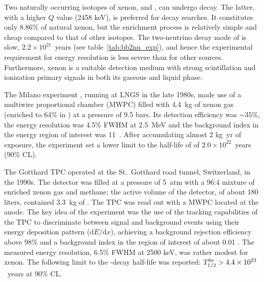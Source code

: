 Two naturally occurring isotopes of xenon,  and , can undergo \bb decay. The latter, with a higher $Q$ value (2458 keV), is preferred for \bbonu decay searches. It constitutes only 8.86\% of natural xenon, but the enrichment process is relatively simple and cheap compared to that of other \bb isotopes. The two-neutrino decay mode of  is slow, $2.2\times10^{21}$~years (see table~\ref{tab:bb2nu_exp}), and hence the experimental requirement for energy resolution is less severe than for other \bb sources. Furthermore, xenon is a suitable detection medium with strong scintillation and ionization primary signals in both its gaseous and liquid phase.

The Milano experiment \cite{Zanotti:1991vh}, running at LNGS in the late 1980s, made use of a multiwire proportional chamber (MWPC) filled with 4.4~kg of xenon gas (enriched to 64\% in ) at a pressure of 9.5 bars. Its detection efficiency was $\sim35\%$, the energy resolution was 4.5\% FWHM at 2.5~MeV and the background index in the energy region of interest was 11~\ckky. After accumulating almost 2 kg~yr of exposure, the experiment set a lower limit to the half-life of  of $2.0\times10^{22}$~years (90\% CL).

The Gotthard TPC \cite{Luscher:1998sd, Vuilleumier:1993zm} operated at the St.\ Gotthard road tunnel, Switzerland, in the 1990s. The detector was filled at a pressure of 5~atm with a 96:4 mixture of enriched xenon gas and methane; the active volume of the detector, of about 180 liters, contained 3.3~kg of . The TPC was read out with a MWPC located at the anode. The key idea of the experiment was the use of the tracking capabilities of the TPC to discriminate between signal and background events using their energy deposition pattern ($\mathrm{d}E/\mathrm{d}x$), achieving a background rejection efficiency above 98\% and a background index in the region of interest of about 0.01 \ckkbby. The measured energy resolution, 6.5\% FWHM at 2500 keV, was rather modest for xenon. The following limit to the  \bbonu-decay half-life was reported: $T^{0\nu}_{1/2} > 4.4\times10^{23}$~years at 90\% CL. 

